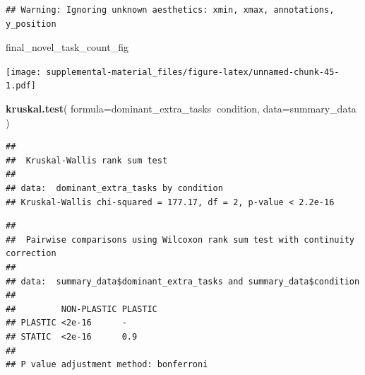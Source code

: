 \documentclass[]{book}
\newenvironment{Shaded}{\begin{snugshade}}{\end{snugshade}}
\newcommand{\DataTypeTok}[1]{\textcolor[rgb]{0.13,0.29,0.53}{#1}}
\newcommand{\FloatTok}[1]{\textcolor[rgb]{0.00,0.00,0.81}{#1}}
\newcommand{\KeywordTok}[1]{\textcolor[rgb]{0.13,0.29,0.53}{\textbf{#1}}}
\newcommand{\NormalTok}[1]{#1}
\newcommand{\OperatorTok}[1]{\textcolor[rgb]{0.81,0.36,0.00}{\textbf{#1}}}
\newcommand{\OtherTok}[1]{\textcolor[rgb]{0.56,0.35,0.01}{#1}}
\newcommand{\StringTok}[1]{\textcolor[rgb]{0.31,0.60,0.02}{#1}}
\begin{document}
\begin{verbatim}
## Warning: Ignoring unknown aesthetics: xmin, xmax, annotations, y_position
\end{verbatim}

\begin{Shaded}
\begin{Highlighting}[]
\NormalTok{final_novel_task_count_fig}
\end{Highlighting}
\end{Shaded}

\texttt{[image: supplemental-material\_files/figure-latex/unnamed-chunk-45-1.pdf]}

\begin{Shaded}
\begin{Highlighting}[]
\KeywordTok{kruskal.test}\NormalTok{(}
  \DataTypeTok{formula=}\NormalTok{dominant_extra_tasks}\OperatorTok{~}\NormalTok{condition,}
  \DataTypeTok{data=}\NormalTok{summary_data}
\NormalTok{)}
\end{Highlighting}
\end{Shaded}

\begin{verbatim}
## 
##  Kruskal-Wallis rank sum test
## 
## data:  dominant_extra_tasks by condition
## Kruskal-Wallis chi-squared = 177.17, df = 2, p-value < 2.2e-16
\end{verbatim}

\begin{Shaded}
\end{Shaded}

\begin{verbatim}
## 
##  Pairwise comparisons using Wilcoxon rank sum test with continuity correction 
## 
## data:  summary_data$dominant_extra_tasks and summary_data$condition 
## 
##         NON-PLASTIC PLASTIC
## PLASTIC <2e-16      -      
## STATIC  <2e-16      0.9    
## 
## P value adjustment method: bonferroni
\end{verbatim}
\end{document}
